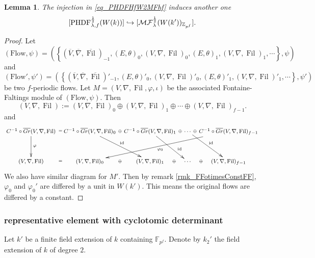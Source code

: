\documentclass[12pt,twoside]{book}
\theoremstyle{plain}
\newtheorem{lemma}[lemma]{Lemma}
\theoremstyle{definition}
\theoremstyle{remark}
\newcommand{\bF}{{\mathbb F}}
\newcommand{\bZ}{{\mathbb Z}}
\DeclareMathOperator\Fil{Fil}
\DeclareMathOperator\id{id}
\newcommand{\MF}{\mathcal{MF}}
\numberwithin{equation}{section}
\def\MFh{\MF^{{1\over 2}}_{\lambda}}
\def\PHDFhf{\mathrm{PHDF}^{{1\over 2}}_{\lambda,f}}
\def\Flow{\mathrm{Flow}}
\begin{document}
\begin{lemma} \label{mthm_PHDFf2MFf}
The injection in \eqref{eq_PHDFHfW2MFhf} induces another one
\begin{equation} \label{eq_PHDFfW2MFfW}
[\PHDFhf(W(k))] \hookrightarrow [\MFh(W(k'))_{\bZ_{p^f}}].
\end{equation}
\end{lemma}

\begin{proof}
Let
\[(\Flow,\psi) = (\left\{
(\overline{V},\overline{\nabla},\overline{\Fil})_{-1},
(E,\theta)_{0},(V,\nabla,\Fil)_{0},(E,\theta)_{1},(V,\nabla,\Fil)_{1},\cdots\right\},\psi)\]
and
\[(\Flow',\psi') = (\left\{
(\overline{V},\overline{\nabla},\overline{\Fil})'_{-1},
(E,\theta)'_{0},(V,\nabla,\Fil)'_{0},(E,\theta)'_{1},(V,\nabla,\Fil)'_{1},\cdots\right\},\psi')\]
be two $f$-periodic flows. Let $M=(V,\nabla,\Fil,\varphi,\iota)$ be the associated Fontaine-Faltings module of $(\Flow,\psi)$. Then \begin{equation}\label{equ_dRtermsSum}
(V,\nabla,\Fil):= ( V,\nabla,\Fil)_0 \oplus ( V,\nabla,\Fil)_1 \oplus \cdots \oplus ( V,\nabla,\Fil)_{f-1}.
\end{equation}
and
\begin{equation*} \footnotesize
\xymatrix@C=2mm@R=1cm{
C^{-1} \circ \overline{Gr} ( V,\nabla,\Fil) \ar[d]^{\varphi} \ar@{}[r]|{=}
& C^{-1} \circ \overline{Gr} ( V,\nabla,\Fil)_0 \ar[dr]^{\id} \ar@{}[r]|-{\oplus}
& C^{-1} \circ \overline{Gr} ( V,\nabla,\Fil)_1 \ar[dr]^(0.7){\id} \ar@{}[r]|-{\oplus}
& \cdots \ar[dr]^{\id} \ar@{}[r]|-{\oplus}
& C^{-1} \circ \overline{Gr} ( V,\nabla,\Fil)_{f-1} \ar[dlll]^{\varphi_0}\\
( V,\nabla,\Fil) \ar@{}[r]|{=}
&( V,\nabla,\Fil)_0 \ar@{}[r]|-{\oplus}
&( V,\nabla,\Fil)_1 \ar@{}[r]|-{\oplus}
&\cdots \ar@{}[r]|-{\oplus}
&( V,\nabla,\Fil)_{f-1} \\
}
\end{equation*}
We also have similar diagram for $M'$. Then by remark \autoref{rmk_FFotimesConstFF}, $\varphi_0$ and $\varphi_0'$ are differed by a unit in $W(k')$. This means the original flows are differed by a constant.
\end{proof}

\subsubsection{representative element with cyclotomic determinant}
Let $k'$ be a finite field extension of $k$ containing $\bF_{p^f}$.
Denote by $k_2'$ the field extension of $k$ of degree $2$.
\end{document}
